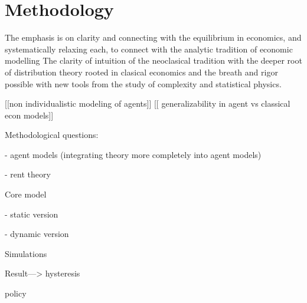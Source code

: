 \chapter{Methodology}


The emphasis is on clarity and connecting with the equilibrium in economics, and systematically relaxing each, to connect with the analytic tradition of economic modelling
The clarity of intuition of the neoclasical tradition with the deeper root of distribution theory rooted in clasical economics and the breath and rigor possible with new tools from the study of complexity and statistical physics.



[[non individualistic modeling of agents]] 
[[ generalizability in agent vs classical econ models]]

Methodological questions: 

    - agent models (integrating theory more completely into agent models)
    
    - rent theory

Core model

    - static version
    
    - dynamic version

Simulations

Result---> hysteresis

policy
